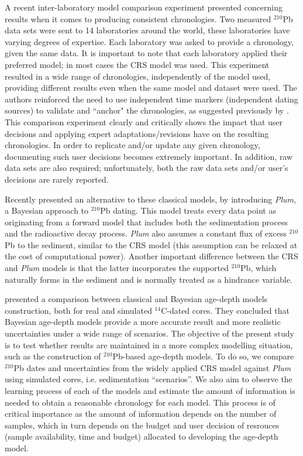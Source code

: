 \documentclass [10pt] {article}
\begin{document}
	A recent inter-laboratory model comparison experiment \citep{Barsanti2020} presented concerning results when it comes to producing consistent chronologies.
Two measured $^{210}$Pb data sets were sent to 14 laboratories around the world, these laboratories have varying degrees of expertise.
Each laboratory was asked to provide a chronology, given the same data. 
It is important to note that each laboratory applied their preferred model; in most cases the CRS model was used.
This experiment resulted in a wide range of chronologies, independently of the model used, providing different results even when the same model and dataset were used.
The authors reinforced the need to use independent time markers (independent dating sources) to validate and ``anchor" the chronologies, as suggested previously by \citep{Smith2001}.  
This comparison experiment clearly and critically shows the impact that user decisions and applying expert adaptations/revisions have on the resulting chronologies.
In order to replicate and/or update any given chronology, documenting such user decisions becomes extremely important.
In addition, raw data sets are also required; unfortunately, both the raw data sets and/or user's decisions are rarely reported.

	Recently \citet{Aquino2018} presented an alternative to these classical models, by introducing \textit{Plum}, a Bayesian approach to $^{210}$Pb dating.
This model treats every data point as originating from a forward model that includes both the sedimentation process and the radioactive decay process.
\textit{Plum} also assumes a constant flux of excess $^{210}$Pb to the sediment, similar to the CRS model (this assumption can be relaxed at the cost of computational power).
Another important difference between the CRS and \textit{Plum} models is that the latter incorporates the supported $^{210}$Pb, which naturally forms in the sediment and is normally treated as a hindrance variable.

	\citet{Blaauw2018} presented a comparison between classical and Bayesian age-depth models construction, both for real and simulated $^{14}$C-dated cores.
They concluded that Bayesian age-depth models provide a more accurate result and more realistic uncertainties under a wide range of scenarios.  
The objective of the present study is to test whether results are maintained in a more complex modelling situation, such as the construction of $^{210}$Pb-based age-depth models.
To do so, we compare $^{210}$Pb dates and uncertainties from the widely applied CRS model against \textit{Plum} using simulated cores, i.e. sedimentation ``scenarios''.
We also aim to observe the learning process of each of the models and estimate the amount of information is needed to obtain a reasonable chronology for each model.
This process is of critical importance as the amount of information depends on the number of samples, which in turn depends on the budget and user decision of resrouces (sample availability, time and budget) allocated to developing the age-depth model. 
\end{document}
